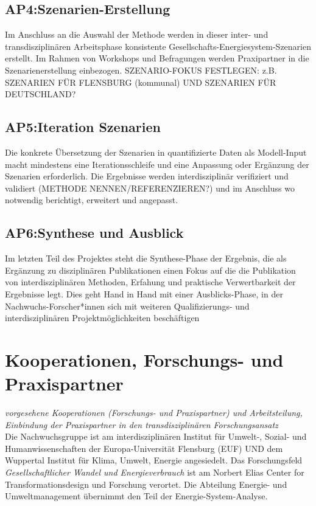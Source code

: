 \documentclass[a4paper,11pt,twoside]{scrartcl}
\begin{document}
\subsection*{AP4:Szenarien-Erstellung}
Im Anschluss an die Auswahl der Methode werden in dieser inter- und transdisziplinären Arbeitsphase konsistente Gesellschafts-Energiesystem-Szenarien erstellt. Im Rahmen von Workshops und Befragungen werden Praxipartner in die Szenarienerstellung einbezogen. SZENARIO-FOKUS FESTLEGEN: z.B. SZENARIEN FÜR FLENSBURG (kommunal) UND SZENARIEN FÜR DEUTSCHLAND?

\subsection*{AP5:Iteration Szenarien}
Die konkrete Übersetzung der Szenarien in quantifizierte Daten als Modell-Input macht mindestens eine Iterationsschleife und eine Anpassung oder Ergänzung der Szenarien erforderlich. Die Ergebnisse werden interdisziplinär verifiziert und validiert (METHODE NENNEN/REFERENZIEREN?) und im Anschluss wo notwendig berichtigt, erweitert und angepasst.

\subsection*{AP6:Synthese und Ausblick}
Im letzten Teil des Projektes steht die Synthese-Phase der Ergebnis, die als Ergänzung zu disziplinären Publikationen einen Fokus auf die die Publikation von interdisziplinären Methoden, Erfahung und praktische Verwertbarkeit der Ergebnisse legt. Dies geht Hand in Hand mit einer Ausblicks-Phase, in der Nachwuchs-Forscher*innen sich mit weiteren Qualifizierungs- und interdisziplinären Projektmöglichkeiten beschäftigen

\section{Kooperationen, Forschungs- und Praxispartner}
\textit{vorgesehene Kooperationen (Forschungs- und Praxispartner) und Arbeitsteilung, Einbindung der Praxispartner in den transdisziplinären Forschungsansatz}\\
Die Nachwuchsgruppe ist am interdisziplinären Institut für Umwelt-, Sozial- und Humanwissenschaften der Europa-Universität Flensburg (EUF) UND dem Wuppertal Institut für Klima, Umwelt, Energie angesiedelt. Das Forschungsfeld \textit{Gesellschaftlicher Wandel und Energieverbrauch} ist am Norbert Elias Center for Transformationsdesign und Forschung verortet. Die Abteilung Energie- und Umweltmanagement übernimmt den Teil der Energie-System-Analyse.
\end{document}

